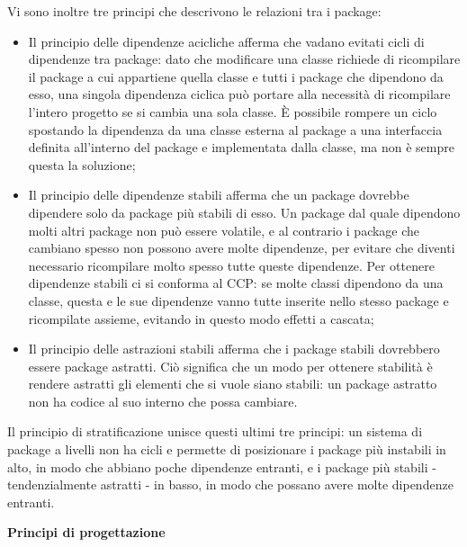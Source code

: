 \documentclass[answers, a4paper, 11pt]{exam}
\begin{document}
\begin{questions}
\begin{parts}
\begin{solution}
Vi sono inoltre tre principi che descrivono le relazioni tra i package:
\begin{itemize}
    \item Il principio delle dipendenze acicliche afferma che vadano evitati cicli di dipendenze tra package: dato che modificare una classe richiede di ricompilare il package a cui appartiene quella classe e tutti i package che dipendono da esso, una singola dipendenza ciclica può portare alla necessità di ricompilare l'intero progetto se si cambia una sola classe. 
    È possibile rompere un ciclo spostando la dipendenza da una classe esterna al package a una interfaccia definita all'interno del package e implementata dalla classe, ma non è sempre questa la soluzione;
    \item Il principio delle dipendenze stabili afferma che un package dovrebbe dipendere solo da package più stabili di esso. 
    Un package dal quale dipendono molti altri package non può essere volatile, e al contrario i package che cambiano spesso non possono avere molte dipendenze, per evitare che diventi necessario ricompilare molto spesso tutte queste dipendenze. 
    Per ottenere dipendenze stabili ci si conforma al CCP: se molte classi dipendono da una classe, questa e le sue dipendenze vanno tutte inserite nello stesso package e ricompilate assieme, evitando in questo modo effetti a cascata;
    \item Il principio delle astrazioni stabili afferma che i package stabili dovrebbero essere package astratti.
    Ciò significa che un modo per ottenere stabilità è rendere astratti gli elementi che si vuole siano stabili: un package astratto non ha codice al suo interno che possa cambiare. 
\end{itemize}

Il principio di stratificazione unisce questi ultimi tre principi: un sistema di package a livelli non ha cicli e permette di posizionare i package più instabili in alto, in modo che abbiano poche dipendenze entranti, e i package più stabili - tendenzialmente astratti - in basso, in modo che possano avere molte dipendenze entranti. 
\end{solution}
\end{parts} 

\question \textbf{Principi di progettazione}
\begin{parts}

\end{parts}
\end{questions}
\end{document}
